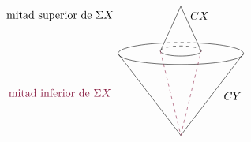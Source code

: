 \[
\begin{tikzpicture}[scale=1]
\draw (-2,0) arc[start angle=180,end angle=360,
    x radius=2,y radius=.35];
\draw (2,0) arc[start angle=0,end angle=75,
    x radius=2,y radius=.35];
\draw[dashed] (75:2 and .35) arc[start angle=75,end angle=105,
    x radius=2,y radius=.35];
\draw (105:2 and .35) arc[start angle=105,end angle=180,
    x radius=2,y radius=.35];

\draw (-2,0) -- (0,-2.6) -- (2,0);

\draw (-.65,.08) -- (0,1.5) -- (.65,.08);
\draw (-.65,.08) arc[start angle=180,end angle=360,
    x radius=.65,y radius=.16];
\draw[dashed] (.65,.08) arc[start angle=0,end angle=180,
    x radius=.65,y radius=.16];
\draw[rojoDiagramaCIMAT, dashed] (-.65,.08) -- (0,-2.6) -- (.65,.08);

\node at (.6,1.2) {$CX$};
\node at (-3.85,1.2) {mitad superior de $\Sigma X$};
\node at (1.65,-1.35) {$CY$};
\node[rojoDiagramaCIMAT] at (-3.85,-1.25) {mitad inferior de $\Sigma X$};
\end{tikzpicture}
\]